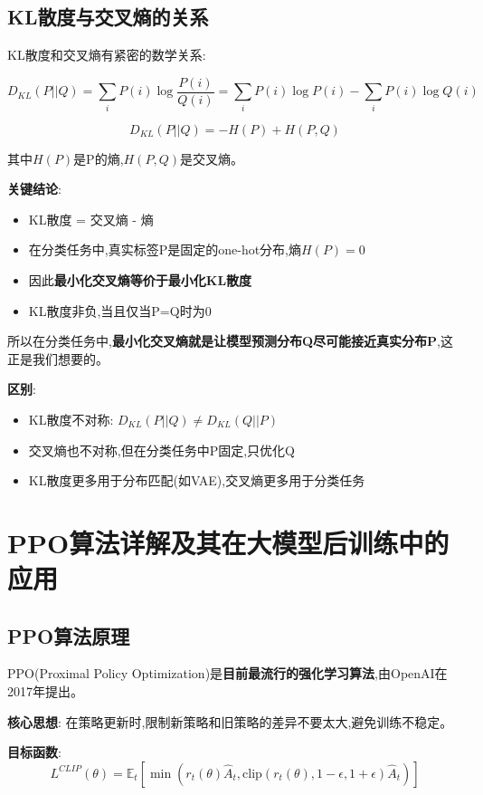 \documentclass[UTF8]{ctexart}
\begin{document}
\subsection{KL散度与交叉熵的关系}

KL散度和交叉熵有紧密的数学关系:

$$D_{KL}(P||Q) = \sum_{i}P(i)\log\frac{P(i)}{Q(i)} = \sum_{i}P(i)\log P(i) - \sum_{i}P(i)\log Q(i)$$

$$D_{KL}(P||Q) = -H(P) + H(P,Q)$$

其中$H(P)$是P的熵,$H(P,Q)$是交叉熵。

\textbf{关键结论}:
\begin{itemize}
    \item KL散度 = 交叉熵 - 熵
    \item 在分类任务中,真实标签P是固定的one-hot分布,熵$H(P)=0$
    \item 因此\textbf{最小化交叉熵等价于最小化KL散度}
    \item KL散度非负,当且仅当P=Q时为0
\end{itemize}

所以在分类任务中,\textbf{最小化交叉熵就是让模型预测分布Q尽可能接近真实分布P},这正是我们想要的。

\textbf{区别}:
\begin{itemize}
    \item KL散度不对称: $D_{KL}(P||Q) \neq D_{KL}(Q||P)$
    \item 交叉熵也不对称,但在分类任务中P固定,只优化Q
    \item KL散度更多用于分布匹配(如VAE),交叉熵更多用于分类任务
\end{itemize}

\section{PPO算法详解及其在大模型后训练中的应用}

\subsection{PPO算法原理}

PPO(Proximal Policy Optimization)是\textbf{目前最流行的强化学习算法},由OpenAI在2017年提出。

\textbf{核心思想}: 在策略更新时,限制新策略和旧策略的差异不要太大,避免训练不稳定。

\textbf{目标函数}:
$$L^{CLIP}(\theta) = \mathbb{E}_t[\min(r_t(\theta)\hat{A}_t, \text{clip}(r_t(\theta), 1-\epsilon, 1+\epsilon)\hat{A}_t)]$$
\end{document}
